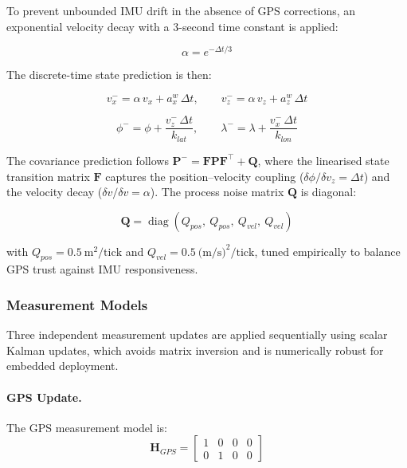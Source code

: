     To prevent unbounded IMU drift in the absence of GPS corrections,
    an exponential velocity decay with a 3-second time constant is applied:

    \begin{equation}
        \alpha = e^{-\Delta t / 3}
    \end{equation}

    The discrete-time state prediction is then:

    \begin{equation}
        v_x^- = \alpha \, v_x + a_x^w \, \Delta t, \qquad
        v_z^- = \alpha \, v_z + a_z^w \, \Delta t
    \end{equation}

    \begin{equation}
        \phi^-  = \phi  + \frac{v_z^- \, \Delta t}{k_{lat}}, \qquad
        \lambda^- = \lambda + \frac{v_x^- \, \Delta t}{k_{lon}}
    \end{equation}

    The covariance prediction follows $\mathbf{P}^- = \mathbf{F}\mathbf{P}\mathbf{F}^\top + \mathbf{Q}$,
    where the linearised state transition matrix $\mathbf{F}$ captures the
    position--velocity coupling ($\delta\phi / \delta v_z = \Delta t$) and
    the velocity decay ($\delta v / \delta v = \alpha$). The process noise
    matrix $\mathbf{Q}$ is diagonal:

    \begin{equation}
        \mathbf{Q} = \operatorname{diag}(Q_{pos},\ Q_{pos},\ Q_{vel},\ Q_{vel})
    \end{equation}

    with $Q_{pos} = 0.5\ \text{m}^2/\text{tick}$ and
    $Q_{vel} = 0.5\ \text{(m/s)}^2/\text{tick}$, tuned empirically to
    balance GPS trust against IMU responsiveness.

    \subsubsection{Measurement Models}

    Three independent measurement updates are applied sequentially using
    scalar Kalman updates, which avoids matrix inversion and is numerically
    robust for embedded deployment.

    \paragraph{GPS Update.}
    The GPS measurement model is:
    \begin{equation}
        \mathbf{H}_{GPS} = \begin{bmatrix} 1 & 0 & 0 & 0 \\ 0 & 1 & 0 & 0 \end{bmatrix}
    \end{equation}


